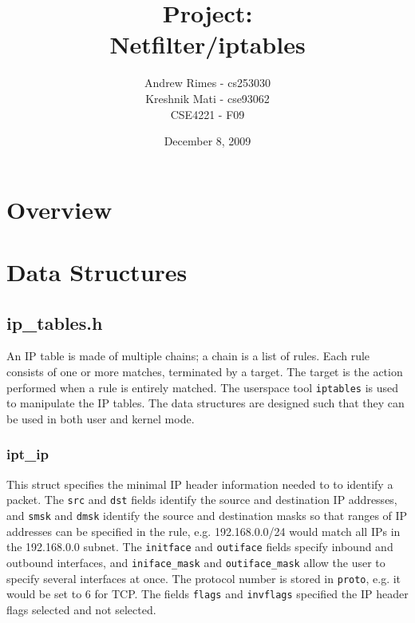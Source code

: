 \documentclass[a4paper,10pt]{article}
\newcommand{\code}[1]{\texttt{#1}}
\begin{document}
\title{\textbf{Project}:\\Netfilter/iptables}
\author{Andrew Rimes - cs253030\\Kreshnik Mati - cse93062\\CSE4221 - F09}
\date{December 8, 2009}

\maketitle
\thispagestyle{empty} 

\newpage

\setcounter{tocdepth}{3}
\tableofcontents


\newpage

\section{Overview}

\section{Data Structures}
  

\subsection{ip\_tables.h}

An IP table is made of multiple chains; a chain is a list of
rules. Each rule consists of one or more matches, terminated by a
target. The target is the action performed when a rule is entirely
matched. The userspace tool \code{iptables} is used to manipulate the IP
tables. The data structures are designed such that they can be used in
both user and kernel mode.

\subsubsection{ipt\_ip}\label{ipt_ip}

This struct specifies the minimal IP header information needed
to to identify a packet. The \code{src} and \code{dst} fields identify
the source and destination IP addresses, and \code{smsk} and
\code{dmsk} identify the source and destination masks so that ranges
of IP addresses can be specified in the rule, e.g. 192.168.0.0/24
would match all IPs in the 192.168.0.0 subnet. The \code{initface} and
\code{outiface} fields specify inbound and outbound interfaces, and
\code{iniface\_mask} and \code{outiface\_mask} allow the user to specify several
interfaces at once. The protocol number is stored in \code{proto},
e.g. it would be set to 6 for TCP. The fields \code{flags} and
\code{invflags} specified the IP header flags selected and not selected.
\end{document}
